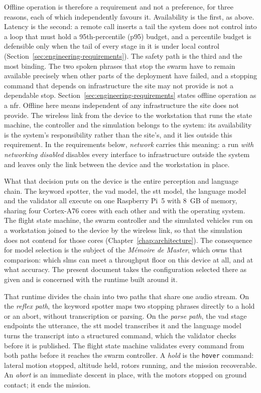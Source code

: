 Offline operation is therefore a requirement and not a preference, for three reasons, each of
which independently favours it. Availability is the first, as above. Latency is the second: a
remote call inserts a tail the system does not control into a loop that must hold a
95th-percentile (p95) budget, and a percentile budget is defensible only when the tail of every
stage in it is under local control (Section~\ref{sec:engineering-requirements}). The safety path
is the third and the most binding. The two spoken phrases that stop the swarm have to remain
available precisely when other parts of the deployment have failed, and a stopping command that
depends on infrastructure the site may not provide is not a dependable stop.
Section~\ref{sec:engineering-requirements} states offline operation as a \gls{nfr}. Offline here
means independent of any infrastructure the site does not provide. The wireless link from the
device to the workstation that runs the state machine, the controller and the simulation belongs to
the system: its availability is the system's responsibility rather than the site's, and it lies
outside this requirement. In the requirements below, \emph{network} carries this meaning: a run
\emph{with networking disabled} disables every interface to infrastructure outside the system and
leaves only the link between the device and the workstation in place.

What that decision puts on the device is the entire perception and language chain. The keyword
spotter, the \gls{vad} model, the \gls{stt} model, the language model and the validator all
execute on one Raspberry Pi~5 with 8~GB of memory, sharing four Cortex-A76 cores with each other
and with the operating system. The flight state machine, the swarm controller and the simulated
vehicles run on a workstation joined to the device by the wireless link, so that the simulation
does not contend for those cores (Chapter~\ref{chap:architecture}). The consequence for model
selection is the subject of the \emph{M\'emoire de Master}, which owns that comparison: which
\glspl{slm} can meet a throughput floor on this device at all, and at what accuracy. The present
document takes the configuration selected there as given and is concerned with the runtime built
around it.

That runtime divides the chain into two paths that share one audio stream. On the \emph{reflex
path}, the keyword spotter maps two stopping phrases directly to a hold or an abort, without
transcription or parsing. On the \emph{parse path}, the \gls{vad} stage endpoints the utterance,
the \gls{stt} model transcribes it and the language model turns the transcript into a structured
command, which the validator checks before it is published. The flight state machine validates
every command from both paths before it reaches the swarm controller. A \emph{hold} is the
\texttt{hover} command: lateral motion stopped, altitude held, rotors running, and the mission
recoverable. An \emph{abort} is an immediate descent in place, with the motors stopped on ground
contact; it ends the mission.

